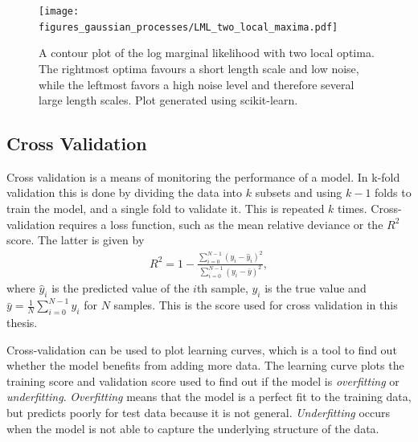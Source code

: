 \documentclass[twoside,english]{uiofysmaster}
\begin{document}
\begin{figure}
\centering
\texttt{[image: figures\_gaussian\_processes/LML\_two\_local\_maxima.pdf]}
\caption{A contour plot of the log marginal likelihood with two local optima. The rightmost optima favours a short length scale and low noise, while the leftmost favors a high noise level and therefore several large length scales. Plot generated using scikit-learn.}
\label{Fig:: gaussian process : LML several local optima}
\end{figure}


\subsection{Cross Validation}


Cross validation is a means of monitoring the performance of a model. In k-fold validation this is done by dividing the data into $k$ subsets and using $k-1$ folds to train the model, and a single fold to validate it. This is repeated $k$ times. Cross-validation requires a loss function, such as the mean relative deviance or the $R^2$ score. The latter is given by 
\begin{align}
R^2 = 1 - \frac{\sum_{i=0}^{N-1} (y_i - \hat{y}_i)^2}{\sum_{i=0}^{N-1} (y_i - \bar{y})^2},
\end{align}
where $\hat{y}_i$ is the predicted value of the $i$th sample, $y_i$ is the true value and $\bar{y} = \frac{1}{N} \sum_{i = 0}^{N-1} y_i$ for $N$ samples. This is the score used for cross validation in this thesis.

Cross-validation can be used to plot learning curves, which is a tool to find out whether the model benefits from adding more data. The learning curve plots the training score and validation score used to find out if the model is \textit{overfitting} or \textit{underfitting}. \textit{Overfitting} means that the model is a perfect fit to the training data, but predicts poorly for test data because it is not general. \textit{Underfitting} occurs when the model is not able to capture the underlying structure of the data. 
\end{document}
